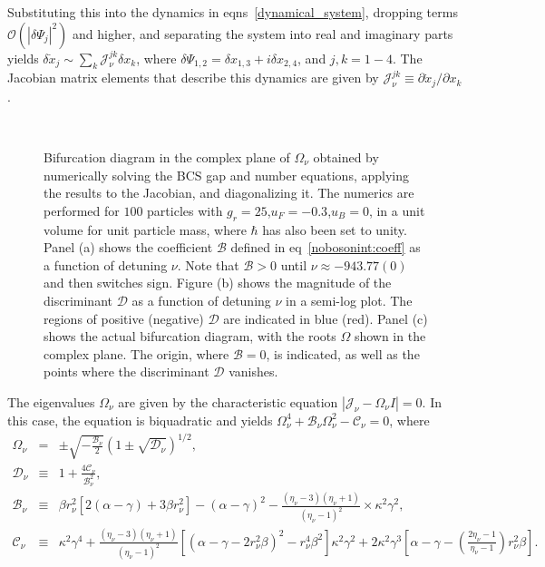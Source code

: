 \documentclass[a4paper,10pt]{report}
\begin{document}
Substituting this into the dynamics in eqns~\ref{dynamical_system}, dropping terms $\mathcal{O}(|\delta\Psi_j|^2)$ and higher, and separating the system into real and imaginary parts yields $\delta \dot{x}_j \sim \sum_k \mathcal{J}^{jk}_\nu\delta x_k$, where $\delta\Psi_{1,2}=\delta x_{1,3} + i \delta x_{2,4}$, and ${j,k}=1-4$. The Jacobian matrix elements that describe this dynamics are given by $\mathcal{J}^{jk}_\nu\equiv\partial\dot{x}_j/\partial x_k$.  
\begin{figure}[h!bt]
\begin{center}
\ 
\end{center}
\caption{Bifurcation diagram in the complex plane of $\Omega_\nu$ obtained by numerically solving the BCS gap and number equations, applying the results to the Jacobian, and diagonalizing it. The numerics are performed for $100$ particles with $g_r=25$,$u_F = -0.3$,$u_B=0$, in a unit volume for unit particle mass, where $\hbar$ has also been set to unity. Panel (a) shows the coefficient $\mathcal{B}$ defined in eq~\ref{nobosonint:coeff} as a function of detuning $\nu$. Note that $\mathcal{B} > 0$ until $\nu \approx -943.77(0)$ and then switches sign. Figure (b) shows the magnitude of the discriminant $\mathcal{D}$ as a function of detuning $\nu$ in a semi-log plot. The regions of positive (negative) $\mathcal{D}$ are indicated in blue (red). Panel (c) shows the actual bifurcation diagram, with the roots $\Omega$ shown in the complex plane. The origin, where $\mathcal{B}=0$, is indicated, as well as the points where the 
discriminant $\mathcal{D}$ vanishes.}
\label{fig:bif:nobosonint}
\end{figure}
The eigenvalues $\Omega_\nu$ are given by the characteristic equation $|\mathcal{J}_\nu-\Omega_\nu I|=0$. In this case, the equation is biquadratic and yields $\Omega_\nu^4 + \mathcal{B}_\nu\Omega_\nu^2-\mathcal{C}_\nu =0$, where
\begin{eqnarray}
\label{roots:jacobian:nobosonint}
\Omega_\nu &=& \pm\sqrt{-\frac{\mathcal{B}_\nu}{2}}\left(1\pm\sqrt{\mathcal{D}_\nu}\right)^{1/2},\nonumber \\
 \mathcal{D}_\nu&\equiv& 1+\frac{4\mathcal{C}_\nu}{\mathcal{B}_\nu^2},\\
\label{nobosonint:coeff}
\mathcal{B}_\nu &\equiv& \beta r_\nu^2 \left[2\left(\alpha-\gamma\right)+3\beta r_\nu^2 \right]-\left(\alpha-\gamma\right)^2-
\frac{\left(\eta_\nu-3\right)\left(\eta_\nu+1\right)}{\left(\eta_\nu-1\right)^2}\times\kappa^2\gamma^2,\nonumber \\
\mathcal{C}_\nu &\equiv& \kappa^2\gamma^4+\frac{\left(\eta_\nu-3\right)\left(\eta_\nu+1\right)}{\left(\eta_\nu-1\right)^2}
\left[\left(\alpha-\gamma-2r^2_\nu\beta\right)^2-r^4_\nu\beta^2 \right]\kappa^2\gamma^2+2\kappa^2\gamma^3\left[\alpha-\gamma-\left(\frac{2\eta_\nu-1}{\eta_\nu-1}\right)r^2_\nu\beta\right].\nonumber \\
\end{eqnarray}
\end{document}
